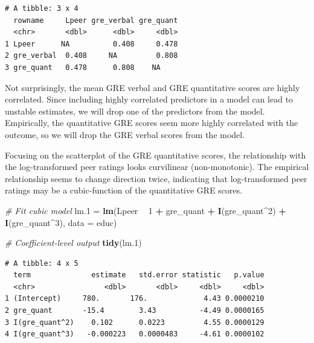 \documentclass[]{book}
\newenvironment{Shaded}{\begin{snugshade}}{\end{snugshade}}
\newcommand{\CommentTok}[1]{\textcolor[rgb]{0.56,0.35,0.01}{\textit{#1}}}
\newcommand{\DataTypeTok}[1]{\textcolor[rgb]{0.13,0.29,0.53}{#1}}
\newcommand{\DecValTok}[1]{\textcolor[rgb]{0.00,0.00,0.81}{#1}}
\newcommand{\FloatTok}[1]{\textcolor[rgb]{0.00,0.00,0.81}{#1}}
\newcommand{\KeywordTok}[1]{\textcolor[rgb]{0.13,0.29,0.53}{\textbf{#1}}}
\newcommand{\NormalTok}[1]{#1}
\newcommand{\OperatorTok}[1]{\textcolor[rgb]{0.81,0.36,0.00}{\textbf{#1}}}
\newcommand{\StringTok}[1]{\textcolor[rgb]{0.31,0.60,0.02}{#1}}
\begin{document}
\begin{Shaded}
\end{Shaded}

\begin{verbatim}
# A tibble: 3 x 4
  rowname     Lpeer gre_verbal gre_quant
  <chr>       <dbl>      <dbl>     <dbl>
1 Lpeer      NA          0.408     0.478
2 gre_verbal  0.408     NA         0.808
3 gre_quant   0.478      0.808    NA    
\end{verbatim}

Not surprisingly, the mean GRE verbal and GRE quantitative scores are highly correlated. Since including highly correlated predictors in a model can lead to unstable estimates, we will drop one of the predictors from the model. Empirically, the quantitative GRE scores seem more highly correlated with the outcome, so we will drop the GRE verbal scores from the model.

Focusing on the scatterplot of the GRE quantitative scores, the relationship with the log-transformed peer ratings looks curvilinear (non-monotonic). The empirical relationship seems to change direction twice, indicating that log-transformed peer ratings may be a cubic-function of the quantitative GRE scores.

\begin{Shaded}
\begin{Highlighting}[]
\CommentTok{# Fit cubic model}
\NormalTok{lm}\FloatTok{.1}\NormalTok{ =}\StringTok{ }\KeywordTok{lm}\NormalTok{(Lpeer }\OperatorTok{~}\StringTok{ }\DecValTok{1} \OperatorTok{+}\StringTok{ }\NormalTok{gre_quant }\OperatorTok{+}\StringTok{ }\KeywordTok{I}\NormalTok{(gre_quant}\OperatorTok{^}\DecValTok{2}\NormalTok{) }\OperatorTok{+}\StringTok{ }\KeywordTok{I}\NormalTok{(gre_quant}\OperatorTok{^}\DecValTok{3}\NormalTok{), }\DataTypeTok{data =}\NormalTok{ educ)}

\CommentTok{# Coefficient-level output}
\KeywordTok{tidy}\NormalTok{(lm}\FloatTok{.1}\NormalTok{)}
\end{Highlighting}
\end{Shaded}

\begin{verbatim}
# A tibble: 4 x 5
  term              estimate   std.error statistic   p.value
  <chr>                <dbl>       <dbl>     <dbl>     <dbl>
1 (Intercept)     780.       176.             4.43 0.0000210
2 gre_quant       -15.4        3.43          -4.49 0.0000165
3 I(gre_quant^2)    0.102      0.0223         4.55 0.0000129
4 I(gre_quant^3)   -0.000223   0.0000483     -4.61 0.0000102
\end{verbatim}
\end{document}
